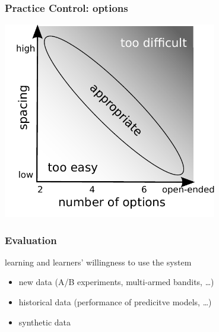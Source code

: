 \documentclass[xcolor=svgnames]{beamer}
\begin{document}
\begin{frame}
	\frametitle{Practice Control: options}
	\begin{center}
		\includegraphics[width=0.7\textwidth]{figure/options_vs_spacing}
	\end{center}
\end{frame}
\begin{frame}
	\frametitle{Evaluation}
	learning and learners' willingness to use the system
	\begin{itemize}
		\item new data (A/B experiments, multi-armed bandits, \ldots)
		\item historical data (performance of predicitve models, \ldots)
		\item synthetic data
	\end{itemize}
\end{frame}
\end{document}
